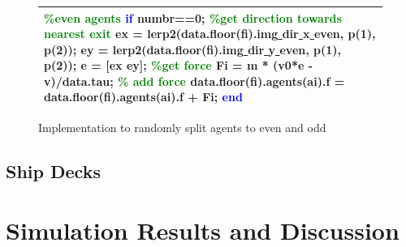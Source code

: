\documentclass[11pt]{article}
\begin{document}
\begin{figure}[H]
\centering
\begin{tabular}
{|>{\large}m{\textwidth}|} \hline
\bigskip
\textcolor{green}{\%even agents}
\newline
\textcolor{blue}{if} numbr==0;
\newline
\textcolor{green}{\%get direction towards nearest exit}
\newline
ex = lerp2(data.floor(fi).img\underline{ }dir\underline{ }x\underline{ }even, p(1), p(2));
\newline
ey = lerp2(data.floor(fi).img\underline{ }dir\underline{ }y\underline{ }even, p(1), p(2));
\newline
e = [ex ey];
\newline
\textcolor{green}{\%get force}
\newline
Fi = m * (v0*e - v)/data.tau;
\newline
\textcolor{green}{\% add force}
\newline
data.floor(fi).agents(ai).f = data.floor(fi).agents(ai).f + Fi;
\newline
\textcolor{blue}{end}
\bigskip
\\ \hline
\end{tabular}
\caption{Implementation to randomly split agents to even and odd}
\end{figure}




\subsection{Ship Decks}
\section{Simulation Results and Discussion}
\end{document}
